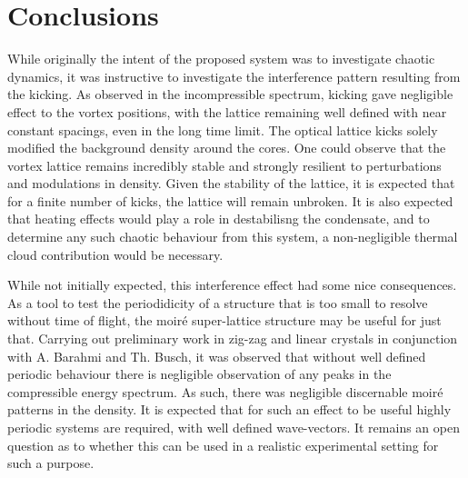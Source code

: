 \section{Conclusions}
\label{sec:ch4_conc}
While originally the intent of the proposed system was to investigate chaotic dynamics, it was instructive to investigate the interference pattern resulting from the kicking. As observed in the incompressible spectrum, kicking gave negligible effect to the vortex positions, with the lattice remaining well defined with near constant spacings, even in the long time limit. The optical lattice kicks solely modified the background density around the cores. One could observe that the vortex lattice remains incredibly stable and strongly resilient to perturbations and modulations in density. Given the stability of the lattice, it is expected that for a finite number of kicks, the lattice will remain unbroken. It is also expected that heating effects would play a role in destabilisng the condensate, and to determine any such chaotic behaviour from this system, a non-negligible thermal cloud contribution would be necessary.

While not initially expected, this interference effect had some nice consequences. As a tool to test the periodidicity of a structure that is too small to resolve without time of flight, the moir\'e super-lattice structure may be useful for just that. Carrying out preliminary work in zig-zag and linear crystals in conjunction with A. Barahmi and Th. Busch, it was observed that without well defined periodic behaviour there is negligible observation of any peaks in the compressible energy spectrum. As such, there was negligible discernable moir\'e patterns in the density. It is expected that for such an effect to be useful highly periodic systems are required, with well defined wave-vectors. It remains an open question as to whether this can be used in a realistic experimental setting for such a purpose.
